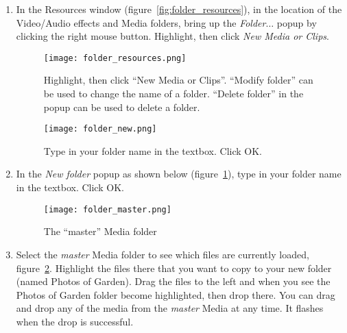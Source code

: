 \begin{enumerate}
    \item In the Resources window (figure~\ref{fig:folder_resources}), in the location of the Video/Audio effects and Media folders, bring up the \textit{Folder}$\dots$ popup by clicking the right mouse button.  
        Highlight, then click \textit{New Media or Clips}.
        \begin{figure}[htpb]
            \begin{minipage}{.6\linewidth}
                \centering
                \texttt{[image: folder\_resources.png]}
                \caption{Highlight, then click “New Media or Clips”.
                    “Modify folder” can be used to   change the name of a folder.
                    “Delete folder” in the popup can be used to delete a folder.
                }
                \label{fig:folder_resources}
            \end{minipage}
            \hfill
            \begin{minipage}{.37\linewidth}
                \centering
                \vspace{18ex}

                \texttt{[image: folder\_new.png]}
                \caption{Type in your folder name in the textbox.  Click OK.}
                \label{fig:folder_new}
            \end{minipage}
        \end{figure}
    \item  In the \textit{New folder} popup as shown below (figure~\ref{fig:folder_new}), type in your folder name in the textbox.  Click OK.
     \begin{figure}[htbp]    
     	\centering
     	\texttt{[image: folder\_master.png]}
     	\caption{The “master” Media folder}
     	\label{fig:folder_master}
     \end{figure}     
    \item  Select the \textit{master} Media folder to see which files are currently loaded, figure~\ref{fig:folder_master}.  
        Highlight the files there that you want to copy to your new folder (named Photos of Garden).  
        Drag the files to the left and when you see the Photos of Garden folder become highlighted, then drop there.  
        You can drag and drop any of the media from the \textit{master} Media at any time.  
        It flashes when the drop is successful.
\end{enumerate}

